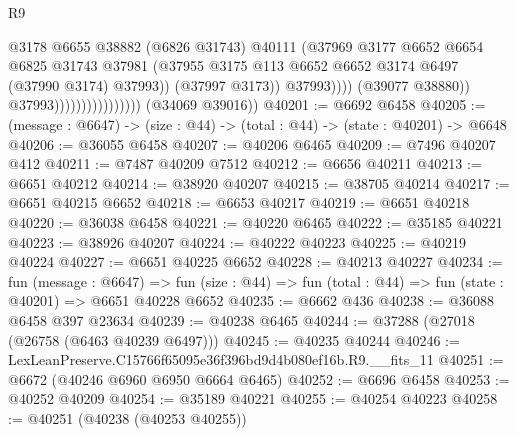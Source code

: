 \begin{lexlean}{R9}
\begin{coremodule}
                                                  @3178
                                                  @6655
                                                  @38882
                                                  (@6826 @31743)
                                                  @40111
                                                  (@37969
                                                    @3177
                                                    @6652
                                                    @6654
                                                    @6825
                                                    @31743
                                                    @37981
                                                    (@37955
                                                      @3175
                                                      @113
                                                      @6652
                                                      @6652
                                                      @3174
                                                      @6497
                                                      (@37990 @3174)
                                                      @37993))
                                                  (@37997 @3173))
                                                @37993))))
                                        (@39077 @38880))
                                      @37993))))))))))))))))
      (@34069 @39016))
@40201 := @6692 @6458
@40205 := (message : @6647) -> (size : @44) -> (total : @44) -> (state : @40201) -> @6648
@40206 := @36055 @6458
@40207 := @40206 @6465
@40209 := @7496 @40207 @412
@40211 := @7487 @40209 @7512
@40212 := @6656 @40211
@40213 := @6651 @40212
@40214 := @38920 @40207
@40215 := @38705 @40214
@40217 := @6651 @40215 @6652
@40218 := @6653 @40217
@40219 := @6651 @40218
@40220 := @36038 @6458
@40221 := @40220 @6465
@40222 := @35185 @40221
@40223 := @38926 @40207
@40224 := @40222 @40223
@40225 := @40219 @40224
@40227 := @6651 @40225 @6652
@40228 := @40213 @40227
@40234 := fun (message : @6647) =>
  fun (size : @44) => fun (total : @44) => fun (state : @40201) => @6651 @40228 @6652
@40235 := @6662 @436
@40238 := @36088 @6458 @397 @23634
@40239 := @40238 @6465
@40244 := @37288 (@27018 (@26758 (@6463 @40239 @6497)))
@40245 := @40235 @40244
@40246 := LexLeanPreserve.C15766f65095e36f396bd9d4b080ef16b.R9.__fits_11
@40251 := @6672 (@40246 @6960 @6950 @6664 @6465)
@40252 := @6696 @6458
@40253 := @40252 @40209
@40254 := @35189 @40221
@40255 := @40254 @40223
@40258 := @40251 (@40238 (@40253 @40255))

\end{coremodule}
\end{lexlean}
